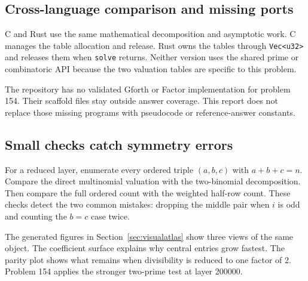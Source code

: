 \subsection{Cross-language comparison and missing ports}

C and Rust use the same mathematical decomposition and asymptotic work. C
manages the table allocation and release. Rust owns the tables through
\texttt{Vec<u32>} and releases them when \texttt{solve} returns. Neither version
uses the shared prime or combinatoric API because the two valuation tables are
specific to this problem.

The repository has no validated Gforth or Factor implementation for problem
154. Their scaffold files stay outside answer coverage. This report does not
replace those missing programs with pseudocode or reference-answer constants.

\subsection{Small checks catch symmetry errors}

For a reduced layer, enumerate every ordered triple $(a,b,c)$ with
$a+b+c=n$. Compare the direct multinomial valuation with the two-binomial
decomposition. Then compare the full ordered count with the weighted
half-row count. These checks detect the two common mistakes: dropping the
middle pair when $i$ is odd and counting the $b=c$ case twice.

The generated figures in Section~\ref{sec:visualatlas} show three views of the
same object. The coefficient surface explains why central entries grow fastest.
The parity plot shows what remains when divisibility is reduced to one factor
of 2. Problem 154 applies the stronger two-prime test at layer 200000.
